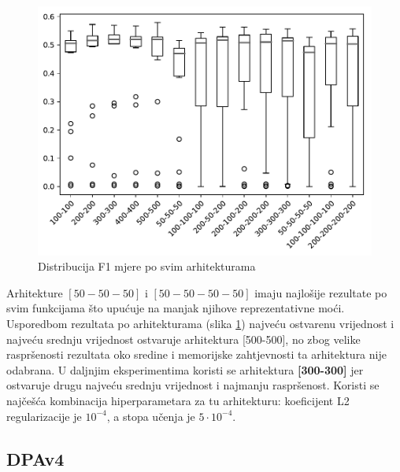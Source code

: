 \documentclass[times, utf8, numeric, diplomski]{fer}
\def\figref#1{(slika \ref{#1})}
\begin{document}
\begin{figure}[ht]
\includegraphics[width=\textwidth]{greedy_256_arch_quality.pdf}
\centering
\caption{Distribucija F1 mjere po svim arhitekturama}
\label{fig:greedy_256_arch_quality}
\end{figure}

Arhitekture $[50-50-50]$ i $[50-50-50-50]$ imaju najlošije rezultate po svim funkcijama što upućuje na manjak njihove reprezentativne moći. Usporedbom rezultata po arhitekturama \figref{fig:greedy_256_arch_quality} najveću ostvarenu vrijednost i najveću srednju vrijednost ostvaruje arhitektura [500-500], no zbog velike raspršenosti rezultata oko sredine i memorijske zahtjevnosti ta arhitektura nije odabrana. U daljnjim eksperimentima koristi se arhitektura \textbf{[300-300]} jer ostvaruje drugu najveću srednju vrijednost i najmanju raspršenost. Koristi se najčešća kombinacija hiperparametara za tu arhitekturu: koeficijent L2 regularizacije je $10^{-4}$, a stopa učenja je $5\cdot 10^{-4}$.

\clearpage

\subsection{DPAv4}
\label{sec:greedy_dpav4}
\end{document}
